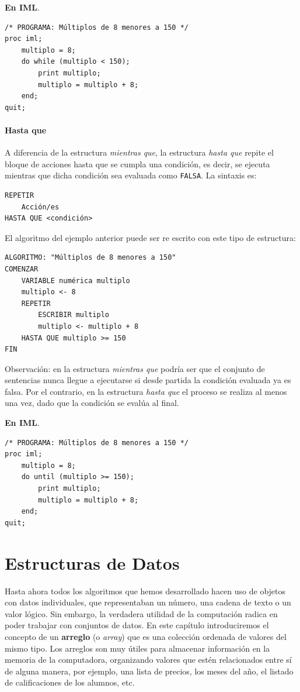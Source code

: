\documentclass[]{book}
\begin{document}
\textbf{En IML}.

\begin{verbatim}
/* PROGRAMA: Múltiplos de 8 menores a 150 */
proc iml;
    multiplo = 8;
    do while (multiplo < 150);
        print multiplo;
        multiplo = multiplo + 8;
    end;
quit;
\end{verbatim}

\subsubsection{Hasta que}\label{hasta-que}

A diferencia de la estructura \emph{mientras que}, la estructura
\emph{hasta que} repite el bloque de acciones hasta que se cumpla una
condición, es decir, se ejecuta mientras que dicha condición sea
evaluada como \texttt{FALSA}. La sintaxis es:

\begin{verbatim}
REPETIR
    Acción/es
HASTA QUE <condición>
\end{verbatim}

El algoritmo del ejemplo anterior puede ser re escrito con este tipo de
estructura:

\begin{verbatim}
ALGORITMO: "Múltiplos de 8 menores a 150"
COMENZAR
    VARIABLE numérica multiplo
    multiplo <- 8
    REPETIR
        ESCRIBIR multiplo
        multiplo <- multiplo + 8
    HASTA QUE multiplo >= 150
FIN
\end{verbatim}

Observación: en la estructura \emph{mientras que} podría ser que el
conjunto de sentencias nunca llegue a ejecutarse si desde partida la
condición evaluada ya es falsa. Por el contrario, en la estructura
\emph{hasta que} el proceso se realiza al menos una vez, dado que la
condición se evalúa al final.

\textbf{En IML}.

\begin{verbatim}
/* PROGRAMA: Múltiplos de 8 menores a 150 */
proc iml;
    multiplo = 8;
    do until (multiplo >= 150);
        print multiplo;
        multiplo = multiplo + 8;
    end;
quit;
\end{verbatim}

\chapter{Estructuras de Datos}\label{estructuras-de-datos}

Hasta ahora todos los algoritmos que hemos desarrollado hacen uso de
objetos con datos individuales, que representaban un número, una cadena
de texto o un valor lógico. Sin embargo, la verdadera utilidad de la
computación radica en poder trabajar con conjuntos de datos. En este
capítulo introduciremos el concepto de un \textbf{arreglo} (o
\emph{array}) que es una colección ordenada de valores del mismo tipo.
Los arreglos son muy útiles para almacenar información en la memoria de
la computadora, organizando valores que estén relacionados entre sí de
alguna manera, por ejemplo, una lista de precios, los meses del año, el
listado de calificaciones de los alumnos, etc.
\end{document}
